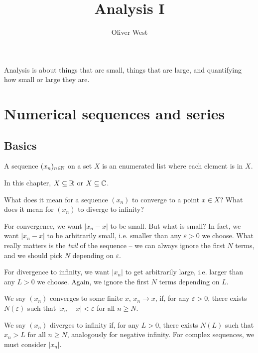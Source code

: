 \documentclass{../../template/note}
\author{Oliver West}
\title{Analysis I}
\date{}
\begin{document}
    \maketitle

    \tableofcontents


    Analysis is about things that are small, things that are large, and quantifying how small or large they are.

    \section{Numerical sequences and series}

    \subsection{Basics}

    \begin{definition}
        A sequence \((x_n)_{n \in \mathbb N}\) on a set \(X\) is an enumerated list where each element is in \(X\).
        
        In this chapter, \(X \subseteq \mathbb R\) or \(X \subseteq \mathbb C\).
    \end{definition}

    What does it mean for a sequence \((x_n)\) to converge to a point \(x \in X\)? What does it mean for \((x_n)\) to diverge to infinity?

    For convergence, we want \(|x_n - x|\) to be small. But what is small? In fact, we want \(|x_n - x|\) to be arbitrarily small, i.e. smaller than any \(\varepsilon > 0\) we choose. What really matters is the \emph{tail} of the sequence -- we can always ignore the first \(N\) terms, and we should pick \(N\) depending on \(\varepsilon\).

    For divergence to infinity, we want \(|x_n|\) to get arbitrarily large, i.e. larger than any \(L > 0\) we choose. Again, we ignore the first \(N\) terms depending on \(L\).
    
    \begin{definition}
        We say \((x_n)\) converges to some finite \(x\), \(x_n \to x\), if, for any \(\varepsilon > 0\), there exists \(N(\varepsilon)\) such that \(|x_n - x| < \varepsilon\) for all \(n \geq N\).

        We say \((x_n)\) diverges to infinity if, for any \(L > 0\), there exists \(N(L)\) such that \(x_n > L\) for all \(n \geq N\), analogously for negative infinity. For complex sequences, we must consider \(|x_n|\).
    \end{definition}
    
\end{document}
